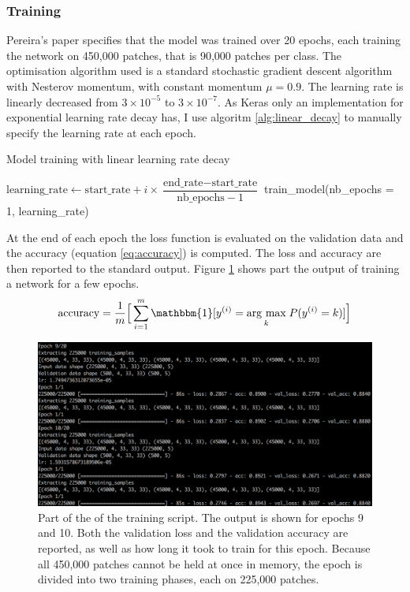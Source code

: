 \documentclass[12pt,a4paper,twoside,openright]{report}
\newcommand{\argmax}[1]{\underset{#1}{\operatorname{arg}\,\operatorname{max}}\;} %
\begin{document}
\subsubsection{Training}
Pereira's paper specifies that the model was trained over 20 epochs, each training the network on 450,000 patches, that is 90,000 patches per class. The optimisation algorithm used is a standard stochastic gradient descent algorithm with Nesterov momentum, with constant momentum $\mu = 0.9$. The learning rate is linearly decreased from $3 \times 10^{-5}$ to $3 \times 10^{-7}$. As Keras only an implementation for exponential learning rate decay has, I use algoritm \ref{alg:linear_decay} to manually specify the learning rate at each epoch.

\begin{algorithm}
\caption{Model training with linear learning rate decay}
\label{alg:linear_decay}
\begin{algorithmic}[1]
	\State $\text{learning\_rate} \gets \text{start\_rate} + i \times \dfrac{\text{end\_rate} - \text{start\_rate} }{ \text{nb\_epochs} - 1 }$
	\State train\_model(nb\_epochs = 1, learning\_rate)
\EndFor
\end{algorithmic}
\end{algorithm}

At the end of each epoch the loss function is evaluated on the validation data and the accuracy (equation \ref{eq:accuracy}) is computed. The loss and accuracy are then reported to the standard output. Figure \ref{fig:training_output} shows part the output of training a network for a few epochs.
\begin{equation}
	\label{eq:accuracy}
		\text{accuracy} = 
	\frac{1}{m}\Big[\sum_{i=1}^m\mathbbm{1}[y^{(i)} = \argmax{k}P(y^{(i)}=k)]\Big]
\end{equation}
\begin{figure}
	\centering
	\includegraphics[width=\textwidth]{training_output}
	\caption[Part of the output of the training script]{Part of the of the training script. The output is shown for epochs 9 and 10. Both the validation loss and the validation accuracy are reported, as well as how long it took to train for this epoch. Because all 450,000 patches cannot be held at once in memory, the epoch is divided into two training phases, each on 225,000 patches.}
	\label{fig:training_output}
\end{figure}
\end{document}
